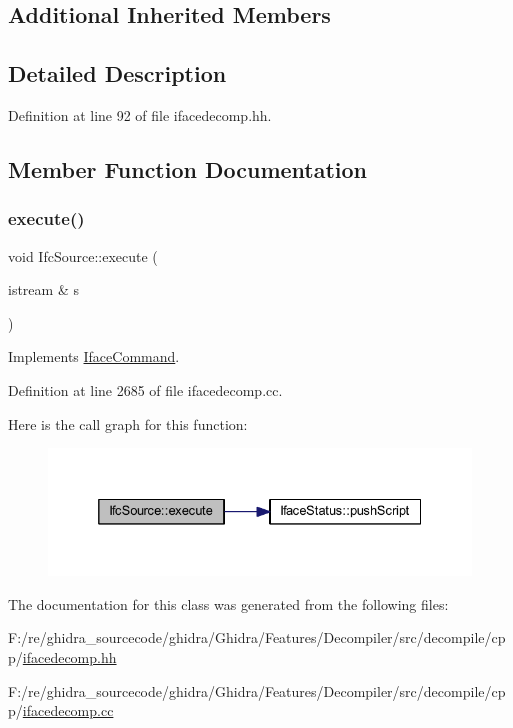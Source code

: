 \subsection*{Additional Inherited Members}


\subsection{Detailed Description}


Definition at line 92 of file ifacedecomp.\+hh.



\subsection{Member Function Documentation}
\mbox{\label{class_ifc_source_a53da0f4768e86d92bea07dc05b4a878f}} 
\subsubsection{\texorpdfstring{execute()}{execute()}}
{\footnotesize\ttfamily void Ifc\+Source\+::execute (\begin{DoxyParamCaption}\item[{istream \&}]{s }\end{DoxyParamCaption})\hspace{0.3cm}{\ttfamily [virtual]}}



Implements \mbox{\hyperlink{class_iface_command_af10e29cee2c8e419de6efe9e680ad201}{Iface\+Command}}.



Definition at line 2685 of file ifacedecomp.\+cc.

Here is the call graph for this function\+:
\nopagebreak
\begin{figure}[H]
\begin{center}
\leavevmode
\includegraphics[width=332pt]{class_ifc_source_a53da0f4768e86d92bea07dc05b4a878f_cgraph}
\end{center}
\end{figure}


The documentation for this class was generated from the following files\+:\begin{DoxyCompactItemize}
\item 
F\+:/re/ghidra\+\_\+sourcecode/ghidra/\+Ghidra/\+Features/\+Decompiler/src/decompile/cpp/\mbox{\hyperlink{ifacedecomp_8hh}{ifacedecomp.\+hh}}\item 
F\+:/re/ghidra\+\_\+sourcecode/ghidra/\+Ghidra/\+Features/\+Decompiler/src/decompile/cpp/\mbox{\hyperlink{ifacedecomp_8cc}{ifacedecomp.\+cc}}\end{DoxyCompactItemize}

